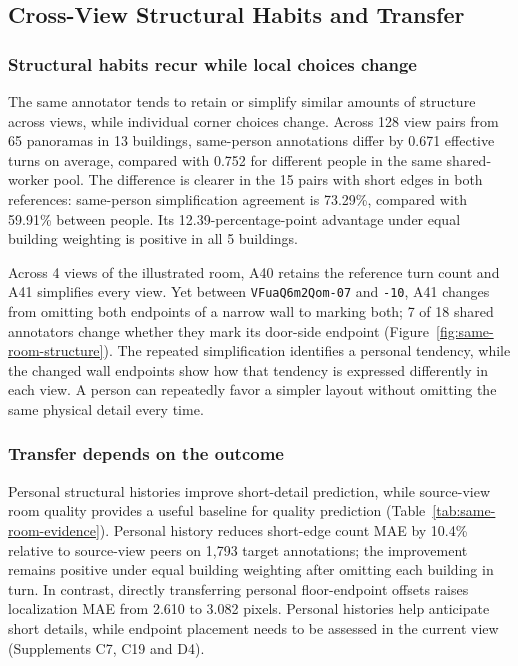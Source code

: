 \subsection{Cross-View Structural Habits and Transfer}
\label{sec:viewpoint-scope}
\subsubsection{Structural habits recur while local choices change}

The same annotator tends to retain or simplify similar amounts of structure across views, while individual corner choices change. Across 128 view pairs from 65 panoramas in 13 buildings, same-person annotations differ by 0.671 effective turns on average, compared with 0.752 for different people in the same shared-worker pool. The difference is clearer in the 15 pairs with short edges in both references: same-person simplification agreement is 73.29\%, compared with 59.91\% between people. Its 12.39-percentage-point advantage under equal building weighting is positive in all 5 buildings.



Across 4 views of the illustrated room, A40 retains the reference turn count and A41 simplifies every view. Yet between \texttt{VFuaQ6m2Qom-07} and \texttt{-10}, A41 changes from omitting both endpoints of a narrow wall to marking both; 7 of 18 shared annotators change whether they mark its door-side endpoint (Figure~\ref{fig:same-room-structure}). The repeated simplification identifies a personal tendency, while the changed wall endpoints show how that tendency is expressed differently in each view. A person can repeatedly favor a simpler layout without omitting the same physical detail every time.

\subsubsection{Transfer depends on the outcome}

Personal structural histories improve short-detail prediction, while source-view room quality provides a useful baseline for quality prediction (Table~\ref{tab:same-room-evidence}). Personal history reduces short-edge count MAE by 10.4\% relative to source-view peers on 1,793 target annotations; the improvement remains positive under equal building weighting after omitting each building in turn. In contrast, directly transferring personal floor-endpoint offsets raises localization MAE from 2.610 to 3.082 pixels. Personal histories help anticipate short details, while endpoint placement needs to be assessed in the current view (Supplements C7, C19 and D4).

